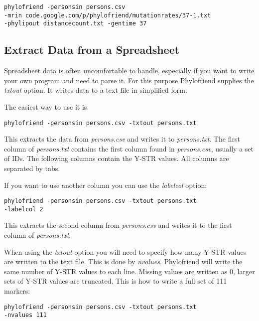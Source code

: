 \noindent\texttt{phylofriend -personsin persons.csv\\
-mrin code.google.com/p/phylofriend/mutationrates/37-1.txt\\
-phylipout distancecount.txt -gentime 37}


\subsection{Extract Data from a Spreadsheet}

Spreadsheet data is often uncomfortable to handle, especially
if you want to write your own program and need to parse it.
For this purpose Phylofriend supplies the \emph{txtout}
option. It writes data to a text file in simplified form.

The easiest way to use it is

\noindent\texttt{phylofriend -personsin persons.csv -txtout persons.txt}

This extracts the data from \emph{persons.csv} and writes
it to \emph{persons.txt}. The first column of \emph{persons.txt}
contains the first column found in \emph{persons.csv}, usually
a set of IDs. The following columns contain the Y-STR values.
All columns are separated by tabs.

If you want to use another column you can use the
\emph{labelcol} option:

\noindent\texttt{phylofriend -personsin persons.csv -txtout persons.txt\\
-labelcol 2}

This extracts the second column from \emph{persons.csv} and
writes it to the first column of \emph{persons.txt}.

When using the \emph{txtout} option you will need to specify
how many Y-STR values are written to the text file. This is
done by \emph{nvalues}. Phylofriend will write the same number
of Y-STR values to each line. Missing values are written as
0, larger sets of Y-STR values are truncated. This is how to
write a full set of 111 markers:

\noindent\texttt{phylofriend -personsin persons.csv -txtout persons.txt\\
-nvalues 111}
















